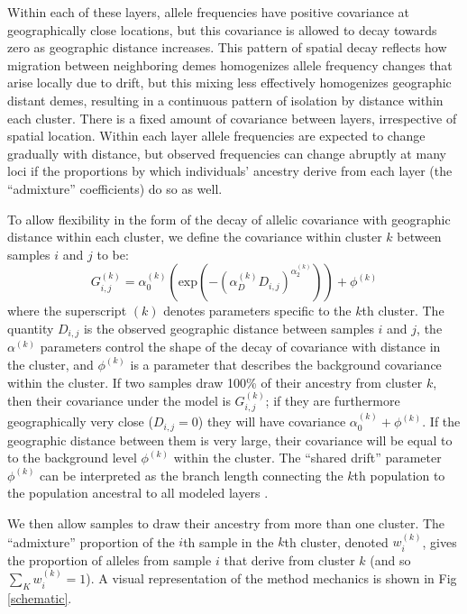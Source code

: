 \documentclass[12pt]{article}
\begin{document}
Within each of these layers,
allele frequencies have positive covariance at geographically close locations,
but this covariance is allowed to decay towards zero as geographic distance increases.
This pattern of spatial decay reflects how migration between neighboring demes  
homogenizes allele frequency changes that arise locally due to drift, 
but this mixing less effectively homogenizes geographic distant demes,
resulting in a continuous pattern of isolation by distance within each cluster.
There is a fixed amount of covariance between layers, irrespective of spatial location.
Within each layer allele frequencies are expected to change gradually with distance,
but observed frequencies can change abruptly at many loci 
if the proportions by which individuals' ancestry derive from each layer 
(the ``admixture'' coefficients) 
do so as well.

To allow flexibility in the form of the decay of allelic covariance with geographic distance within each cluster, 
we define the covariance within cluster $k$ between samples $i$ and $j$ to be:
\begin{equation}
G^{(k)}_{i,j} 
    = 
    \alpha^{(k)}_0 \left( \text{exp} \left( -(\alpha^{(k)}_D D_{i,j}) ^ {\alpha^{(k)}_2}	\right) \right) + \phi^{(k)}
\label{within_cluster_covariance}
\end{equation}
where the superscript $(k)$ denotes parameters specific to the $k$th cluster.
The quantity $D_{i,j}$ is the observed geographic distance between samples $i$ and $j$,
the $\alpha^{(k)}$ parameters control the shape of the decay of covariance with distance in the cluster,
and $\phi^{(k)}$ is a parameter that describes the background covariance within the cluster. 
If two samples draw 100\% of their ancestry from cluster $k$, then their covariance under the model is $G^{(k)}_{i,j}$;
if they are furthermore geographically very close ($D_{i,j}=0$)
they will have covariance $\alpha^{(k)}_0 +  \phi^{(k)}$.
If the geographic distance between them is very large, 
their covariance will be equal to to the background level $\phi^{(k)}$ within the cluster.
The ``shared drift'' parameter $\phi^{(k)}$ can be interpreted as the branch length 
connecting the $k$th population to the population ancestral to all modeled
layers \citep{patterson_ancient_2012, peter_fstats}.

We then allow samples to draw their ancestry from more than one cluster.
The ``admixture'' proportion of the $i$th sample in the $k$th cluster, denoted $w^{(k)}_i$,
gives the proportion of alleles from sample $i$ that derive from
cluster $k$ (and so $\sum_K w^{(k)}_i =1$).
A visual representation of the method mechanics is shown in Fig \ref{schematic}.
\end{document}
